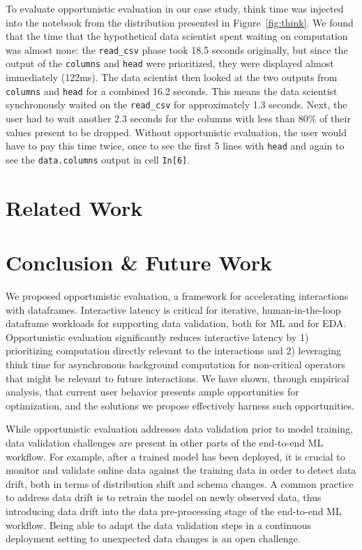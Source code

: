 \documentclass[11pt]{article}
\newcommand{\code}[1]{\texttt{#1}}
\newcommand{\thinktime}[0]{think time\xspace}
\begin{document}
To evaluate opportunistic evaluation in our case study, \thinktime was injected into
the notebook from the distribution presented in Figure~\ref{fig:think}.
We found that the time that the hypothetical data scientist spent waiting on computation was
almost none: the \code{read\_csv} phase took 18.5 seconds originally, but since
the output of the \code{columns} and \code{head} were prioritized, they were
displayed almost immediately (122ms). The data scientist then looked at the
two outputs from \code{columns} and \code{head} for a combined 16.2 seconds.
This means the data scientist synchronously waited on the \code{read\_csv} for approximately
1.3 seconds. Next, the user had to wait another 2.3 seconds for the columns
with less than 80\% of their values present to be dropped. Without opportunistic
evaluation, the user would have to pay this time twice, once to see the first
5 lines with \code{head} and again to see the \code{data.columns} output in 
cell \code{In[6]}. 


\section{Related Work}


\section{Conclusion \& Future Work}
We proposed opportunistic evaluation, a framework for accelerating interactions with dataframes. Interactive latency is critical for iterative, human-in-the-loop dataframe workloads for supporting data validation, both for ML and for EDA. Opportunistic evaluation significantly reduces interactive latency by 1) prioritizing computation directly relevant to the interactions and 2) leveraging \thinktime for asynchronous background computation for non-critical operators that might be relevant to future interactions. We have shown, through empirical analysis, that current user behavior presents ample opportunities for optimization, and the solutions we propose effectively harness such opportunities. 

While opportunistic evaluation addresses data validation prior to model training, data validation challenges are present in other parts of the end-to-end ML workflow. For example, after a trained model has been deployed, it is crucial to monitor and validate online data against the training data in order to detect data drift, both in terms of distribution shift and schema changes. A common practice to address data drift is to retrain the model on newly observed data, thus introducing data drift into the data pre-processing stage of the end-to-end ML workflow. Being able to adapt the data validation steps in a continuous deployment setting to unexpected data changes is an open challenge.
\end{document}
